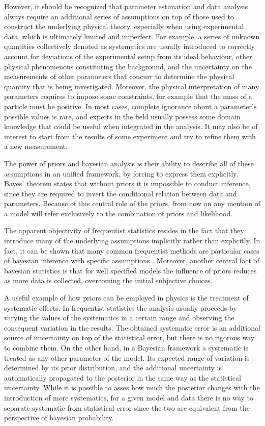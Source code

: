 However, it should be recognized that parameter estimation and data analysis always require an additional series of assumptions on top of
those used to construct the underlying physical theory, especially when using experimental data, which is ultimately limited and
imperfect.
For example, a series of unknown quantities collectively denoted as systematics are usually introduced to
correctly account for deviations of the experimental setup from its ideal behaviour, other physical phenomenons
constituting the background, and the uncertainty on the measurements of other parameters that concurr to determine the
physical quantity that is being investigated. Moreover, the physical interpretation of many parameters requires to
impose some constraints, for example that the mass of a particle must be positive.
In most cases, complete ignorance about a parameter's possible values is rare, and experts in the field usually possess
some domain knowledge that could be useful when integrated in the analysis. It may also be of interest to start from the
results of some experiment and try to refine them with a new measurement. 

The power of priors and bayesian analysis is their ability to describe all of these assumptions in an unified
framework, by forcing to express them explicitly. Bayes' theorem
states that without priors it is impossible to conduct inference, since they are required to invert the conditional
relation between data and parameters.
Because of this central role of the priors, from now on any mention of a model will refer exclusively to the combination
of priors and likelihood. %

The apparent objectivity of frequentist statistics resides in the fact that they introduce many of the underlying assumptions
implicitly
rather than explicitly. In fact, it can be shown that many common frequentist methods are particular cases of bayesian
inference with specific assumptions \cite{d2003bayesian}. Moreover, another central fact of bayesian statistics is that for well
specified models the influence of priors reduces as more data is collected, overcoming the initial subjective choices.


A useful example of how priors can be employed in physics is the treatment of systematic effects. In frequentist statistics the
analysis usually proceeds by varying the values of the systematics in a certain range and observing the consequent variation in
the results. The obtained systematic error is an additional source of uncertainty on top of the statistical error, but
there is no rigorous way to combine them. On the other hand, in a Bayesian framework a systematic is treated as any
other parameter of the model. Its expected range of variation is determined by its prior distribution, and the
additional uncertainty is automatically propagated to the posterior in the same way as the statistical uncertainty.
While it is possible to asses how much the posterior changes with the introduction of more systematics, for a given
model and data there is no way
to separate systematic from statistical error since the two are equivalent from the perspective of bayesian probability.


